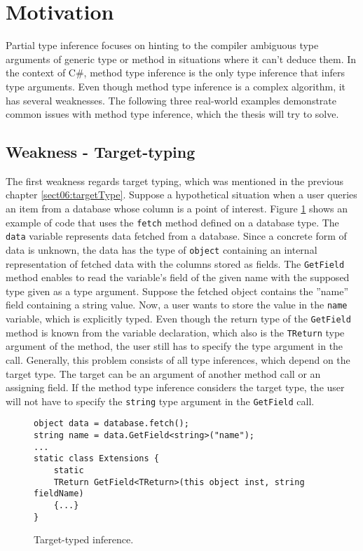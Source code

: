 \section{Motivation}

Partial type inference focuses on hinting to the compiler ambiguous type arguments of generic type or method in situations where it can’t deduce them. 
In the context of C\#, method type inference is the only type inference that infers type arguments. 
Even though method type inference is a complex algorithm, it has several weaknesses. 
The following three real-world examples demonstrate common issues with method type inference, which the thesis will try to solve.

\subsection{Weakness - Target-typing}
The first weakness regards target typing, which was mentioned in the previous chapter \ref{sect06:targetType}. 
Suppose a hypothetical situation when a user queries an item from a database whose column is a point of interest. 
Figure \ref{img27:usecase1} shows an example of code that uses the \texttt{fetch} method defined on a database type. 
The \texttt{data} variable represents data fetched from a database. 
Since a concrete form of data is unknown, the data has the type of \texttt{object} containing an internal representation of fetched data with the columns stored as fields. 
The \texttt{GetField} method enables to read the variable’s field of the given name with the supposed type given as a type argument. 
Suppose the fetched object contains the ”name” field containing a string value. 
Now, a user wants to store the value in the \texttt{name} variable, which is explicitly typed. 
Even though the return type of the \texttt{GetField} method is known from the variable declaration, which also is the \texttt{TReturn} type argument of the method, the user still has to specify the type argument in the call. 
Generally, this problem consists of all type inferences, which depend on the target type. The target can be an argument of another method call or an assigning field. 
If the method type inference considers the target type, the user will not have to specify the \texttt{string} type argument in the \texttt{GetField} call.
\begin{figure}[h]
\begin{lstlisting}[style=csharp]
object data = database.fetch();
string name = data.GetField<string>("name");
...
static class Extensions {
    static 
    TReturn GetField<TReturn>(this object inst, string fieldName) 
    {...}
}
\end{lstlisting}
\caption{Target-typed inference.}
\label{img27:usecase1}
\end{figure}

